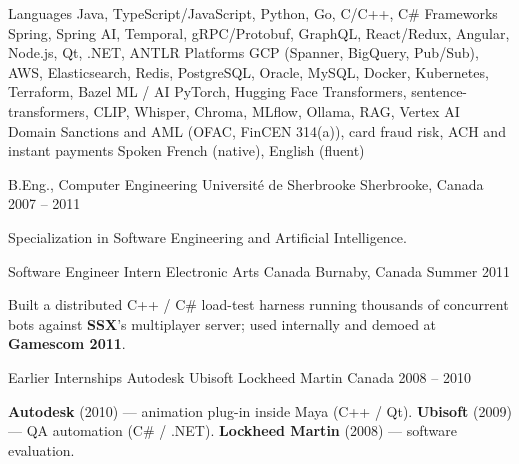 \documentclass[11pt, letterpaper]{awesome-cv}
\begin{document}
\begin{cvskills}
  \cvskill
    {Languages}
    {Java, TypeScript/JavaScript, Python, Go, C/C++, C\#}
  \cvskill
    {Frameworks}
    {Spring, Spring AI, Temporal, gRPC/Protobuf, GraphQL, React/Redux, Angular, Node.js, Qt, .NET, ANTLR}
  \cvskill
    {Platforms}
    {GCP (Spanner, BigQuery, Pub/Sub), AWS, Elasticsearch, Redis, PostgreSQL, Oracle, MySQL, Docker, Kubernetes, Terraform, Bazel}
  \cvskill
    {ML / AI}
    {PyTorch, Hugging Face Transformers, sentence-transformers, CLIP, Whisper, Chroma, MLflow, Ollama, RAG, Vertex AI}
  \cvskill
    {Domain}
    {Sanctions and AML (OFAC, FinCEN 314(a)), card fraud risk, ACH and instant payments}
  \cvskill
    {Spoken}
    {French (native), English (fluent)}
\end{cvskills}

\begin{cventries}

  \cventry
    {B.Eng., Computer Engineering}
    {Université de Sherbrooke}
    {Sherbrooke, Canada}
    {2007 -- 2011}
    {
      \begin{cvitems}
        \item {Specialization in Software Engineering and Artificial Intelligence.}
      \end{cvitems}
    }

\end{cventries}

\begin{cventries}

  \cventry
    {Software Engineer Intern}
    {Electronic Arts Canada}
    {Burnaby, Canada}
    {Summer 2011}
    {
      \begin{cvitems}
        \item {Built a distributed C++ / C\# load-test harness running thousands of concurrent bots against \textbf{SSX}'s multiplayer server; used internally and demoed at \textbf{Gamescom 2011}.}
      \end{cvitems}
    }

  \cventry
    {Earlier Internships}
    {Autodesk \quad\textbar\quad Ubisoft \quad\textbar\quad Lockheed Martin}
    {Canada}
    {2008 -- 2010}
    {
      \begin{cvitems}
        \item {\textbf{Autodesk} (2010) --- animation plug-in inside Maya (C++ / Qt). \textbf{Ubisoft} (2009) --- QA automation (C\# / .NET). \textbf{Lockheed Martin} (2008) --- software evaluation.}
      \end{cvitems}
    }

\end{cventries}
\end{document}
